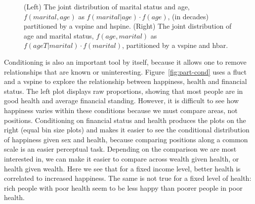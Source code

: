 \documentclass[journal]{vgtc}
\begin{document}
\begin{figure}[htbp]
\begin{minipage}[t]{0.49\linewidth}
 \end{minipage}
  \caption{(Left) The joint distribution of marital status and age, $f(marital, age)$ as $f(marital|age) \cdot f(age)$, (in decades) partitioned by a vspine and hspine.  (Right) The joint distribution of age and marital status, $f(age, marital)$ as $f(age T|marital) \cdot f(marital)$, partitioned by a vspine and hbar.}
  \label{fig:marital}
\end{figure}

Conditioning is also an important tool by itself, because it allows one to remove relationships that are known or uninteresting. Figure~\ref{fig:part-cond} uses a fluct and a vspine to explore the relationship between happiness, health and financial status. The left plot displays raw proportions, showing that most people are in good health and average financial standing. However, it is difficult to see how happiness varies within these conditions because we must compare areas, not positions. Conditioning on financial status and health produces the plots on the right (equal bin size plots) and makes it easier to see the conditional distribution of happiness given sex and health, because comparing positions along a common scale is an easier perceptual task. Depending on the comparison we are most interested in, we can make it easier to compare across wealth given health, or health given wealth. Here we see that for a fixed income level, better health is correlated to increased happiness. The same is not true for a fixed level of health: rich people with poor health seem to be less happy than poorer people in poor health.
\end{document}

